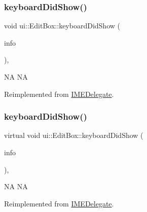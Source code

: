 \subsubsection{\texorpdfstring{keyboard\+Did\+Show()}{keyboardDidShow()}\hspace{0.1cm}{\footnotesize\ttfamily [1/2]}}
{\footnotesize\ttfamily void ui\+::\+Edit\+Box\+::keyboard\+Did\+Show (\begin{DoxyParamCaption}\item[{\hyperlink{structIMEKeyboardNotificationInfo}{I\+M\+E\+Keyboard\+Notification\+Info} \&}]{info }\end{DoxyParamCaption})\hspace{0.3cm}{\ttfamily [override]}, {\ttfamily [virtual]}}

NA  NA 

Reimplemented from \hyperlink{classIMEDelegate_a3d55e52ab965ccfdacaed053484785e9}{I\+M\+E\+Delegate}.

\mbox{\label{classui_1_1EditBox_ad5095cb70eebd06257e074c7b043ea89}} 
\subsubsection{\texorpdfstring{keyboard\+Did\+Show()}{keyboardDidShow()}\hspace{0.1cm}{\footnotesize\ttfamily [2/2]}}
{\footnotesize\ttfamily virtual void ui\+::\+Edit\+Box\+::keyboard\+Did\+Show (\begin{DoxyParamCaption}\item[{\hyperlink{structIMEKeyboardNotificationInfo}{I\+M\+E\+Keyboard\+Notification\+Info} \&}]{info }\end{DoxyParamCaption})\hspace{0.3cm}{\ttfamily [override]}, {\ttfamily [virtual]}}

NA  NA 

Reimplemented from \hyperlink{classIMEDelegate_a3d55e52ab965ccfdacaed053484785e9}{I\+M\+E\+Delegate}.

\mbox{\label{classui_1_1EditBox_afa54a7e9d06de4524963bf23565e8310}} 

